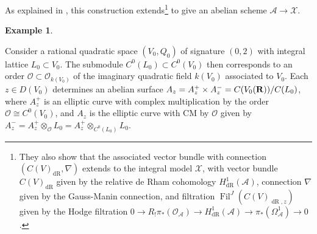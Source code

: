\documentclass{amsart}
\theoremstyle{definition}
\theoremstyle{definition}
\newtheorem{example}[theorem]{Example}
\theoremstyle{definition}
\begin{document}
As explained in \cite{AGHMP}, this construction extends\footnote{They also show that the associated vector bundle with 
connection $(C(V)_{\operatorname{dR}}, \nabla)$ extends to the integral model $\mathcal{X}$, with vector bundle $C(V)_{\operatorname{dR}}$
given by the relative de Rham cohomology $H^1_{\operatorname{dR}}(\mathcal{A})$, connection $\nabla$ given by the Gauss-Manin
connection, and filtration $\operatorname{Fil}^J(C(V)_{\operatorname{dR}, z})$ given by the Hodge filtration 
$0 \longrightarrow R_{!} \pi_*(\mathcal{O}_{\mathcal{A}}) \longrightarrow H^1_{\operatorname{dR}}(\mathcal{A}) 
\longrightarrow \pi_*(\Omega_{\mathcal{A}}^1) \longrightarrow 0$.} to give an abelian scheme $\mathcal{A} \rightarrow \mathcal{X}$.

\begin{example}\label{KSAVn=0} 

Consider a rational quadratic space $(V_0, Q_0)$ of signature $(0, 2)$ with integral lattice $L_0 \subset V_0$.
The submodule $C^0(L_0) \subset C^0(V_0)$ then corresponds to an order $\mathcal{O} \subset \mathcal{O}_{k(V_0)}$ of the imaginary quadratic 
field $k(V_0)$ associated to $V_0$. Each $z \in D(V_0)$ determines an abelian surface $A_z = A_z^+ \times A_z^- = C(V_0({\bf{R}}))/C(L_0)$, 
where $A_z^+$ is an elliptic curve with complex multiplication by the order
$\mathcal{O} \cong C^0(V_0)$, and $A_z$ is the elliptic curve with CM by $\mathcal{O}$ given by 
$A_z^- = A_z^+ \otimes_{\mathcal{O}} L_0 = A_z^+ \otimes_{C^0(L_0)} L_0$. 

\end{example}
\end{document}
